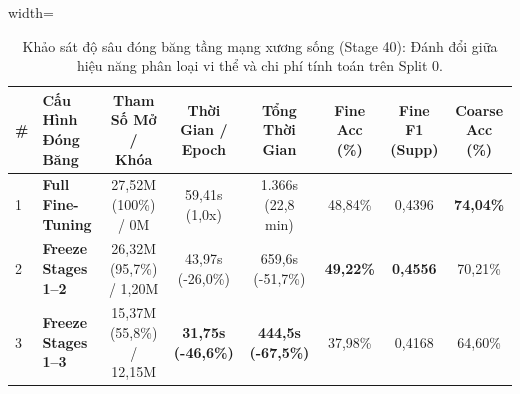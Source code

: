 \begin{table}[t]
\centering
\small
\caption{Khảo sát độ sâu đóng băng tầng mạng xương sống (Stage 40): Đánh đổi giữa hiệu năng phân loại vi thể và chi phí tính toán trên Split 0.}
\label{tab:ablation_freezing_depth}
\begin{adjustbox}{width=\textwidth}
\begin{tabular}{llcccccc}
\toprule
\textbf{\#} & \textbf{Cấu Hình Đóng Băng} & \textbf{Tham Số Mở / Khóa} & \textbf{Thời Gian / Epoch} & \textbf{Tổng Thời Gian} & \textbf{Fine Acc (\%)} & \textbf{Fine F1 (Supp)} & \textbf{Coarse Acc (\%)} \\
\midrule
1 & \textbf{Full Fine-Tuning} & 27,52M (100\%) / 0M & 59,41s (1,0x) & 1.366s (22,8 min) & 48,84\% & 0,4396 & \textbf{74,04\%} \\
2 & \textbf{Freeze Stages 1--2} & 26,32M (95,7\%) / 1,20M & 43,97s (-26,0\%) & 659,6s (-51,7\%) & \textbf{49,22\%} & \textbf{0,4556} & 70,21\% \\
3 & \textbf{Freeze Stages 1--3} & 15,37M (55,8\%) / 12,15M & \textbf{31,75s (-46,6\%)} & \textbf{444,5s (-67,5\%)} & 37,98\% & 0,4168 & 64,60\% \\
\bottomrule
\end{tabular}
\end{adjustbox}
\end{table}
